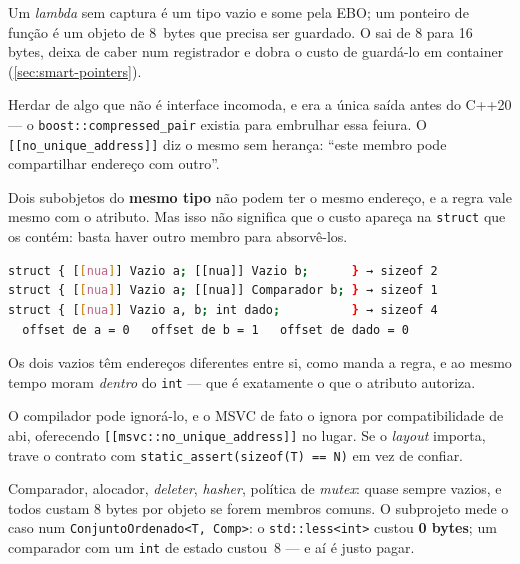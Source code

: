 \begin{armadilha}
Um \emph{lambda} sem captura é um tipo vazio e some pela EBO; um ponteiro de
função é um objeto de 8~bytes que precisa ser guardado. O
 sai de 8 para 16 bytes, deixa de caber num registrador
e dobra o custo de guardá-lo em container (\cref{sec:smart-pointers}).
\end{armadilha}

Herdar de algo que não é interface incomoda, e era a única saída antes do C++20
--- o \texttt{boost::compressed\_pair} existia para embrulhar essa feiura. O
\texttt{[[no\_unique\_address]]} diz o mesmo sem herança: ``este membro pode
compartilhar endereço com outro''.

\begin{armadilha}
Dois subobjetos do \textbf{mesmo tipo} não podem ter o mesmo endereço, e a regra
vale mesmo com o atributo. Mas isso não significa que o custo apareça na
\texttt{struct} que os contém: basta haver outro membro para absorvê-los.
\begin{lstlisting}[style=bt, language=bash, frame=none,
                   xleftmargin=0pt, xrightmargin=0pt]
struct { [[nua]] Vazio a; [[nua]] Vazio b;      } → sizeof 2
struct { [[nua]] Vazio a; [[nua]] Comparador b; } → sizeof 1
struct { [[nua]] Vazio a, b; int dado;          } → sizeof 4
  offset de a = 0   offset de b = 1   offset de dado = 0
\end{lstlisting}
Os dois vazios têm endereços diferentes entre si, como manda a regra, e ao mesmo
tempo moram \emph{dentro} do \texttt{int} --- que é exatamente o que o atributo
autoriza.
\end{armadilha}

\begin{armadilha}
O compilador pode ignorá-lo, e o MSVC de fato o ignora por compatibilidade de
\gls{abi}, oferecendo \texttt{[[msvc::no\_unique\_address]]} no lugar. Se o
\emph{layout} importa, trave o contrato com
\texttt{static\_assert(sizeof(T)~==~N)} em vez de confiar.
\end{armadilha}

\begin{regra}
Comparador, alocador, \emph{deleter}, \emph{hasher}, política de \emph{mutex}:
quase sempre vazios, e todos custam 8 bytes por objeto se forem membros comuns.
O subprojeto mede o caso num \texttt{ConjuntoOrdenado<T, Comp>}: o
\texttt{std::less<int>} custou \textbf{0 bytes}; um comparador com um
\texttt{int} de estado custou~8 --- e aí é justo pagar.
\end{regra}

